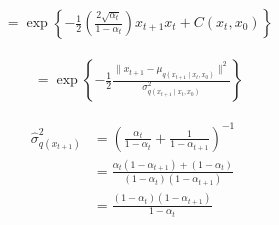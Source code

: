 \documentclass{article}
\begin{document}
\begin{align*}
&= \exp \left\{ -\frac{1}{2} \left( \frac{2 \sqrt{\alpha_t}}{1-\alpha_t} \right) x_{t+1} x_t + C \left( x_t, x_0 \right) \right\}
\end{align*}

\begin{align*}
&= \exp \left\{ -\frac{1}{2} \frac{\| x_{t+1} - \mu_{q \left( x_{t+1} \mid x_t, x_0 \right)} \|^2}{\sigma^2_{q \left( x_{t+1} \mid x_t, x_0 \right)}} \right\}
\end{align*}

\begin{align*}
\hat{\sigma}^2_{q \left( x_{t+1} \right)} &= \left( \frac{\alpha_t}{1-\alpha_t} + \frac{1}{1-\alpha_{t+1}} \right)^{-1} \\
&= \frac{\alpha_t (1-\alpha_{t+1}) + (1-\alpha_t)}{(1-\alpha_t)(1-\alpha_{t+1})} \\
&= \frac{(1-\alpha_t)(1-\alpha_{t+1})}{1-\alpha_t}
\end{align*}
\end{document}

